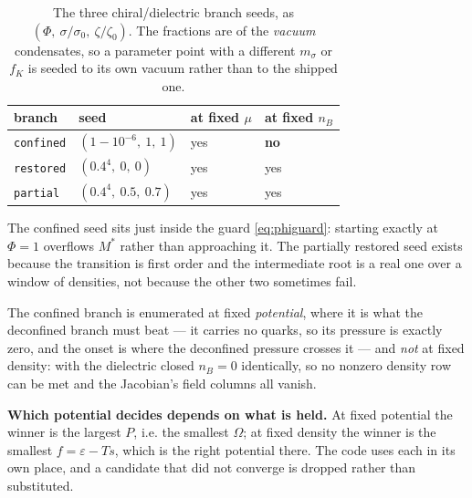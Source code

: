 \documentclass[11pt,a4paper]{article}
\newcommand{\Mstar}{M^{*}}
\newcommand{\code}[1]{\texttt{#1}}
\begin{document}
\begin{table}[h]
\centering
\caption{The three chiral/dielectric branch seeds, as
$(\Phi,\ \sigma/\sigma_0,\ \zeta/\zeta_0)$. The fractions are of the
\emph{vacuum} condensates, so a parameter point with a different $m_\sigma$ or
$f_K$ is seeded to its own vacuum rather than to the shipped one.}
\label{tab:branches}
\begin{tabular}{llll}
\toprule
branch & seed & at fixed $\mu$ & at fixed $n_B$ \\
\midrule
\code{confined} & $(1-10^{-6},\ 1,\ 1)$ & yes & \textbf{no} \\
\code{restored} & $(0.4^4,\ 0,\ 0)$ & yes & yes \\
\code{partial}  & $(0.4^4,\ 0.5,\ 0.7)$ & yes & yes \\
\bottomrule
\end{tabular}
\end{table}

The confined seed sits just inside the guard \eqref{eq:phiguard}: starting
exactly at $\Phi=1$ overflows $\Mstar$ rather than approaching it. The
partially restored seed exists because the transition is first order and the
intermediate root is a real one over a window of densities, not because the
other two sometimes fail.

The confined branch is enumerated at fixed \emph{potential}, where it is what
the deconfined branch must beat --- it carries no quarks, so its pressure is
exactly zero, and the onset is where the deconfined pressure crosses it ---
and \emph{not} at fixed density: with the dielectric closed $n_B=0$
identically, so no nonzero density row can be met and the Jacobian's field
columns all vanish.

\textbf{Which potential decides depends on what is held.} At fixed potential
the winner is the largest $P$, i.e. the smallest $\Omega$; at fixed density the
winner is the smallest $f=\varepsilon-Ts$, which is the right potential there.
The code uses each in its own place, and a candidate that did not converge is
dropped rather than substituted.
\end{document}
